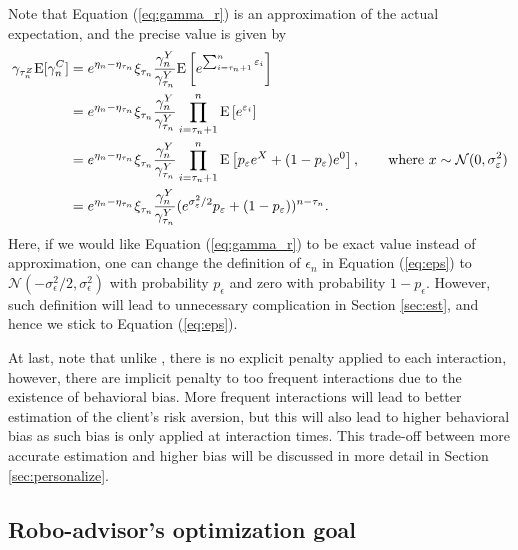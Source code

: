 Note that Equation (\ref{eq:gamma_r}) is an approximation of the actual expectation, and the precise value is given by \begin{equation}\label{eq:gamma_r_acc}
\begin{aligned}
        \gamma_{\tau_n^Z}\mathrm{E}[\gamma_n^C]&=e^{\eta_n-\eta_{\tau_n}}\xi_{\tau_n}\frac{\gamma_n^{Y}}{\gamma_{\tau_n}^{Y}}\mathrm{E}\left[e^{\sum_{i=\tau_n+1}^n\varepsilon_i}\right]\\
        &=e^{\eta_n-\eta_{\tau_n}}\xi_{\tau_n}\frac{\gamma_n^{Y}}{\gamma_{\tau_n}^{Y}}\prod_{i=\tau_n+1}^n \mathrm{E}\left[e^{\varepsilon_i}\right]\\
        &=e^{\eta_n-\eta_{\tau_n}}\xi_{\tau_n}\frac{\gamma_n^{Y}}{\gamma_{\tau_n}^{Y}}\prod_{i=\tau_n+1}^n \mathrm{E}\left[p_\varepsilon e^{X}+(1-p_\varepsilon)e^0\right],\qquad\text{where }x\sim\mathcal{N}(0,\sigma_\varepsilon^2)\\
        &=e^{\eta_n-\eta_{\tau_n}}\xi_{\tau_n}\frac{\gamma_n^{Y}}{\gamma_{\tau_n}^{Y}}(e^{\sigma^2_\varepsilon/2}p_\varepsilon + (1-p_\varepsilon))^{n-\tau_n}.
\end{aligned}
\end{equation} Here, if we would like Equation (\ref{eq:gamma_r}) to be exact value instead of approximation, one can change the definition of $\epsilon_n$ in Equation (\ref{eq:eps}) to $\mathcal{N}(-\sigma^2_\epsilon/2,\sigma_\epsilon^2)$ with probability $p_\epsilon$ and zero with probability $1-p_\epsilon$. However, such definition will lead to unnecessary complication in Section \ref{sec:est}, and hence we stick to Equation (\ref{eq:eps}).

At last, note that unlike , there is no explicit penalty applied to each interaction, however, there are implicit penalty to too frequent interactions due to the existence of behavioral bias. More frequent interactions will lead to better estimation of the client's risk aversion, but this will also lead to higher behavioral bias as such bias is only applied at interaction times. This trade-off between more accurate estimation and higher bias will be discussed in more detail in Section \ref{sec:personalize}.


\subsection{Robo-advisor's optimization goal}

